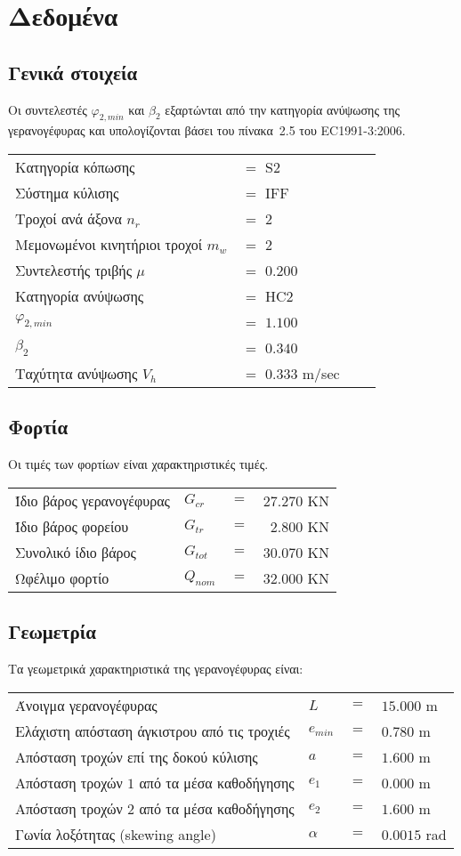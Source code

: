 \section{Δεδομένα}
\subsection{Γενικά στοιχεία}
Οι συντελεστές $φ_{2,min}$ και $β_2$ εξαρτώνται από την κατηγορία ανύψωσης της γερανογέφυρας και υπολογίζονται βάσει του πίνακα~2.5 του EC1991-3:2006.

\begin{tabular}{llcr}
Κατηγορία κόπωσης					&$=$ S2 \\ 
Σύστημα κύλισης						&$=$ IFF \\ 
Τροχοί ανά άξονα	$n_r$			&$=$ $2$ \\ 
Μεμονωμένοι κινητήριοι τροχοί $m_w$ &$=$ $2$ \\
Συντελεστής τριβής $\mu$			&$=$ $0.200$ \\ 
Κατηγορία ανύψωσης					&$=$ HC2 \\
$φ_{2,min}$							&$=$ $1.100$ \\ 
$β_2$								&$=$ $0.340$ \\
Ταχύτητα ανύψωσης  $V_h$			&$=$ $0.333$ m/sec
\end{tabular}

\subsection{Φορτία}
Οι τιμές των φορτίων είναι χαρακτηριστικές τιμές.

\begin{tabular}{llcr}
Ίδιο βάρος γερανογέφυρας     & $G_{cr}$  &$=$ &$27.270$ KN \\ 
Ίδιο βάρος φορείου           & $G_{tr}$  &$=$ &$ 2.800$ KN \\ 
Συνολικό ίδιο βάρος          & $G_{tot}$ &$=$ &$30.070$ KN \\ 
Ωφέλιμο φορτίο               & $Q_{nom}$ &$=$ &$32.000$ KN 
\end{tabular}

\subsection{Γεωμετρία}
Τα γεωμετρικά χαρακτηριστικά της γερανογέφυρας είναι:

\begin{tabular}{llcl}
Άνοιγμα γερανογέφυρας                                 &$L$		  &$=$ &$15.000$ m \\ 
Ελάχιστη απόσταση άγκιστρου από τις τροχιές   		  &$e_{min}$  &$=$ &$0.780$ m \\ 
Απόσταση τροχών επί της δοκού κύλισης                 &$a$		  &$=$ &$1.600$ m \\ 
Απόσταση τροχών $1$ από τα μέσα καθοδήγησης           &$e_1$      &$=$ &$0.000$ m \\ 
Απόσταση τροχών $2$ από τα μέσα καθοδήγησης           &$e_2$      &$=$ &$1.600$ m \\
Γωνία λοξότητας (skewing angle)						  &$α$		  &$=$ &$0.0015$ rad
\end{tabular}

